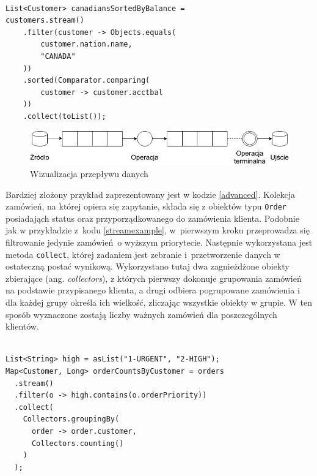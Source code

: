 \documentclass[12pt,twoside,openright]{extarticle}
\begin{document}
\begin{lstlisting}[label=streamexample, caption=Przykładowe wykorzystanie Stream API]

List<Customer> canadiansSortedByBalance = 
customers.stream()
    .filter(customer -> Objects.equals(
        customer.nation.name,
        "CANADA"
    ))
    .sorted(Comparator.comparing(
        customer -> customer.acctbal
    ))
    .collect(toList());

\end{lstlisting}

\begin{figure}[h]
\centering
\includegraphics[width=14cm]{flow.png}
\caption{Wizualizacja przepływu danych}
\label{fig:flow}
\end{figure}

    Bardziej złożony przykład zaprezentowany jest w kodzie \ref{advanced}. Kolekcja zamówień, na której opiera się zapytanie, składa się z obiektów typu \texttt{Order} posiadająch status oraz przyporządkowanego do zamówienia klienta. Podobnie jak w przykładzie z~kodu \ref{streamexample}, w~pierwszym kroku przeprowadza się filtrowanie jedynie zamówień~o wyższym priorytecie. Następnie wykorzystana jest metoda \texttt{collect}, której zadaniem jest zebranie i~przetworzenie danych w ostateczną postać wynikową. Wykorzystano tutaj dwa zagnieżdżone obiekty zbierające (ang. \textit{collectors}), z których pierwszy dokonuje grupowania zamówień na podstawie przypisanego klienta, a drugi odbiera pogrupowane zamówienia i dla każdej grupy określa ich wielkość, zliczając wszystkie obiekty w grupie. W ten sposób wyznaczone zostają liczby ważnych zamówień dla poszczególnych klientów.

\begin{lstlisting}[label=advanced, caption=Zaawansowane wykorzystanie Stream API]

List<String> high = asList("1-URGENT", "2-HIGH");
Map<Customer, Long> orderCountsByCustomer = orders
  .stream()
  .filter(o -> high.contains(o.orderPriority))
  .collect(
    Collectors.groupingBy(
      order -> order.customer,
      Collectors.counting()
    )
  );
  
    

\end{lstlisting}
\end{document}
